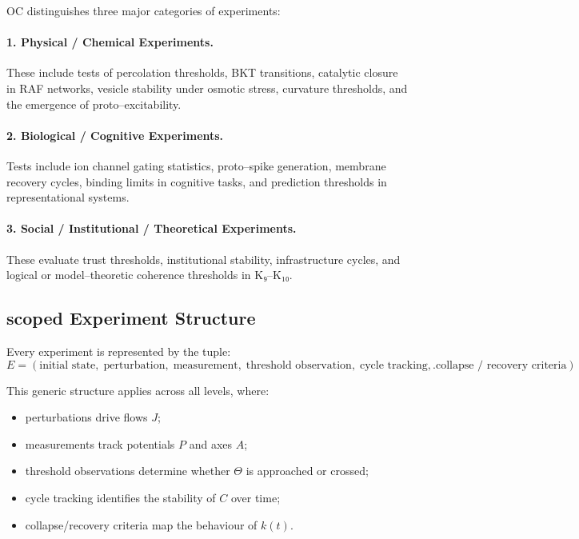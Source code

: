 OC distinguishes three major categories of experiments:

\paragraph{1. Physical / Chemical Experiments.}
These include tests of percolation thresholds, BKT transitions, catalytic
closure in RAF networks, vesicle stability under osmotic stress, curvature
thresholds, and the emergence of proto–excitability.

\paragraph{2. Biological / Cognitive Experiments.}
Tests include ion channel gating statistics, proto–spike generation,
membrane recovery cycles, binding limits in cognitive tasks, and prediction
thresholds in representational systems.

\paragraph{3. Social / Institutional / Theoretical Experiments.}
These evaluate trust thresholds, institutional stability, infrastructure
cycles, and logical or model–theoretic coherence thresholds in K₉–K₁₀.


\subsection{scoped Experiment Structure}

Every experiment is represented by the tuple:
\[
   E = (\text{initial state},\;
         \text{perturbation},\;
         \text{measurement},\;
         \text{threshold observation},\;
         \text{cycle tracking},\;
         \text{collapse / recovery criteria}).
\]

This generic structure applies across all levels, where:

\begin{itemize}
    \item perturbations drive flows $J$;
    \item measurements track potentials $P$ and axes $A$;
    \item threshold observations determine whether $\Theta$ is approached or
          crossed;
    \item cycle tracking identifies the stability of $C$ over time;
    \item collapse/recovery criteria map the behaviour of $k(t)$.
\end{itemize}


